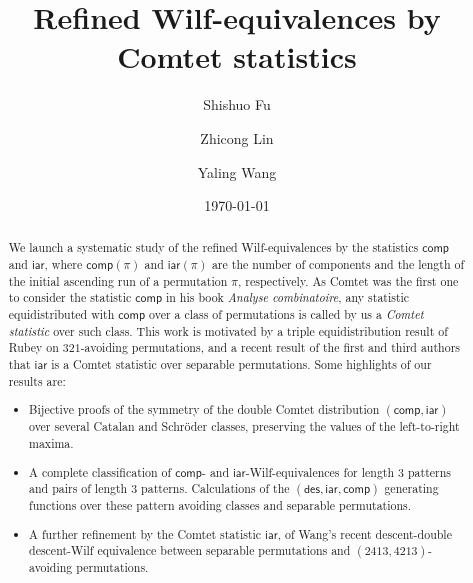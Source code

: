 \documentclass[12pt]{amsart}
\numberwithin{equation}{section}
\theoremstyle{plain}
\theoremstyle{definition}
\def\des{\mathsf{des}}
\def\iar{\mathsf{iar}}
\def\comp{\mathsf{comp}}
\begin{document}
\title[Refined Wilf-equivalences]{Refined Wilf-equivalences by Comtet statistics}

\author[S. Fu]{Shishuo Fu}
\address[Shishuo Fu]{College of Mathematics and Statistics, Chongqing University, Huxi campus, Chongqing 401331, P.R. China}

\author[Z. Lin]{Zhicong Lin}
\address[Zhicong Lin]{Research Center for Mathematics and Interdisciplinary Sciences, Shandong University, Qingdao 266237, P.R. China}

\author[Y. Wang]{Yaling Wang}
\address[Yaling Wang]{College of Mathematics and Statistics, Chongqing University, Huxi campus, Chongqing 401331, P.R. China}

\date{\today}


\begin{abstract}
We launch a systematic study of the refined Wilf-equivalences by the statistics $\comp$ and $\iar$, where  $\comp(\pi)$ and $\iar(\pi)$ are  the number of components and the length of the initial ascending run of a permutation $\pi$, respectively. As Comtet was the first one to consider the statistic $\comp$ in his book {\em Analyse combinatoire},  any statistic equidistributed with $\comp$ over a class of permutations is called by us a {\em Comtet statistic} over such class. This work is motivated by a triple equidistribution result of Rubey on $321$-avoiding permutations, and a recent result of the first and third authors that $\iar$ is a Comtet statistic over separable permutations. Some highlights of our results are: 
\begin{itemize}
	\item Bijective proofs of the symmetry of the double Comtet distribution $(\comp,\iar)$ over several Catalan and Schr\"oder classes, preserving the values of the left-to-right maxima.
	\item A complete classification of $\comp$- and $\iar$-Wilf-equivalences for length $3$ patterns and pairs of length $3$ patterns. Calculations of the $(\des,\iar,\comp)$ generating functions over these pattern avoiding classes and separable permutations.
	\item A further refinement by the Comtet statistic $\iar$, of Wang's recent descent-double descent-Wilf equivalence between separable permutations and $(2413,4213)$-avoiding permutations.
\end{itemize}
\end{abstract}
\end{document}
